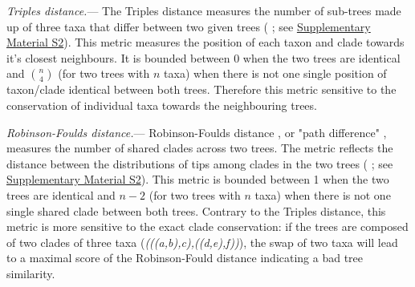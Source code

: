 \documentclass[12pt,letterpaper]{article}
\renewcommand{\subsubsection}[1]{%
\vspace{2ex}
\noindent
\textit{#1.}---}
\begin{document}
\subsubsection{Triples distance}
The Triples distance \citep{dobson1975triplets} measures the number of sub-trees made up of three taxa that differ between two given trees (\citealt{critchlowthe1996} ; see \hyperref[SupplementaryMaterial]{Supplementary Material S2}).
This metric measures the position of each taxon and clade towards it's closest neighbours.
It is bounded between 0 when the two trees are identical and $\binom{n}{4}$ (for two trees with $n$ taxa) when there is not one single position of taxon/clade identical between both trees.
Therefore this metric sensitive to the conservation of individual taxa towards the neighbouring trees.

\subsubsection{Robinson-Foulds distance} %
Robinson-Foulds distance \citep{RF1981}, or "path difference"
    , measures the number of shared clades across two trees.
The metric reflects the distance between the distributions of tips among clades in the two trees (\citealt{RF1981} ; see \hyperref[SupplementaryMaterial]{Supplementary Material S2}).
This metric is bounded between 1 when the two trees are identical and $n-2$ (for two trees with $n$ taxa) when there is not one single shared clade between both trees.
Contrary to the Triples distance, this metric is more sensitive to the exact clade conservation: if the trees are composed of two clades of three taxa (\textit{(((a,b),c),((d,e),f))}), the swap of two taxa will lead to a maximal score of the Robinson-Fould distance indicating a bad tree similarity.

\end{document}
